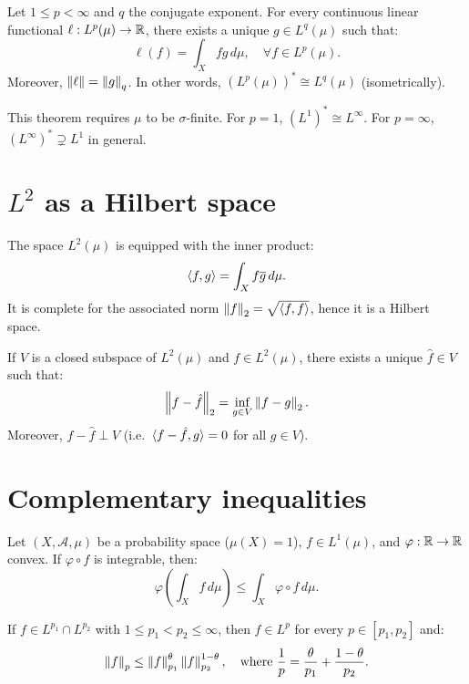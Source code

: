\begin{theorem}[$L^p$--$L^q$ duality]
\label{thm:lp_duality}
Let $1 \leq p < \infty$ and $q$ the conjugate exponent. For every continuous linear
functional $\ell : L^p(\mu) \to \mathbb{R}$, there exists a unique $g \in L^q(\mu)$ such
that:
\[
\ell(f) = \int_X fg\, d\mu, \quad \forall f \in L^p(\mu).
\]
Moreover, $\left\| \ell \right\| = \left\| g \right\|_q$. In other words,
$(L^p(\mu))^* \cong L^q(\mu)$ (isometrically).
\end{theorem}

\begin{remark}
This theorem requires $\mu$ to be $\sigma$-finite. For $p = 1$,
$(L^1)^* \cong L^\infty$. For $p = \infty$, $(L^\infty)^* \supsetneq L^1$ in
general.
\end{remark}

\section{$L^2$ as a Hilbert space}

\begin{definition}
The space $L^2(\mu)$ is equipped with the inner product:
\[
\langle f, g \rangle = \int_X f \overline{g}\, d\mu.
\]
It is complete for the associated norm $\left\| f \right\|_2 = \sqrt{\langle f, f \rangle}$, hence
it is a Hilbert space.
\end{definition}

\begin{theorem}
If $V$ is a closed subspace of $L^2(\mu)$ and $f \in L^2(\mu)$, there exists a
unique $\hat{f} \in V$ such that:
\[
\left\| f - \hat{f} \right\|_2 = \inf_{g \in V} \left\| f - g \right\|_2.
\]
Moreover, $f - \hat{f} \perp V$ (i.e.\ $\langle f - \hat{f}, g \rangle = 0$ for all
$g \in V$).
\end{theorem}

\section{Complementary inequalities}

\begin{proposition}
\label{prop:jensen}
Let $(X, \mathcal{A}, \mu)$ be a probability space ($\mu(X) = 1$),
$f \in L^1(\mu)$, and $\varphi : \mathbb{R} \to \mathbb{R}$ convex. If $\varphi \circ f$ is
integrable, then:
\[
\varphi\!\left(\int_X f\, d\mu\right) \leq \int_X \varphi \circ f\, d\mu.
\]
\end{proposition}

\begin{proposition}
If $f \in L^{p_1} \cap L^{p_2}$ with $1 \leq p_1 < p_2 \leq \infty$, then
$f \in L^p$ for every $p \in [p_1, p_2]$ and:
\[
\left\| f \right\|_p \leq \left\| f \right\|_{p_1}^{\theta} \left\| f \right\|_{p_2}^{1-\theta}, \quad
\text{where } \frac{1}{p} = \frac{\theta}{p_1} + \frac{1-\theta}{p_2}.
\]
\end{proposition}

